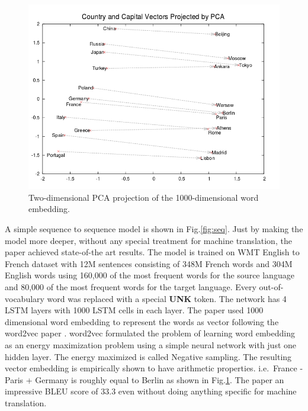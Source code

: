\documentclass[a4paper]{article}
\begin{document}
\begin{figure}
  \centering
  \includegraphics[width=.9\linewidth]{img/wordvec.png}
  \caption{
    Two-dimensional PCA projection of the 1000-dimensional word embedding.
  }
  \label{fig:wordvec}
\end{figure}


A simple  sequence to  sequence  model is  shown  in Fig.\ref{fig:seq}.  Just by
making  the model  more  deeper,  without  any  special  treatment  for  machine
translation, the paper  achieved state-of-the art results. The model is  trained
on WMT English to French  dataset with 12M sentences consisting  of  348M French
words and  304M English  words using  160,000 of the most frequent words for the
source language and  80,000 of the most  frequent words for the target language.
Every out-of-vocabulary word was replaced with a special \textbf{UNK} token. The
network has  4  LSTM layers with 1000 LSTM cells in each  layer. The  paper used
1000 dimensional word embedding  to  represent the words as vector following the
word2vec paper \cite{mikolov2013distributed}. word2vec formulated the problem of
learning word embedding as an energy maximization problem using a  simple neural
network  with just one  hidden layer.  The  energy  maximized is called Negative
sampling. The resulting vector embedding is empirically shown to have arithmetic
properties. i.e. $\,$France -  Paris +  Germany  is roughly  equal  to Berlin as
shown  in Fig.\ref{fig:wordvec}. The paper an impressive BLEU score of 33.3 even
without doing anything specific for machine translation.
\end{document}
